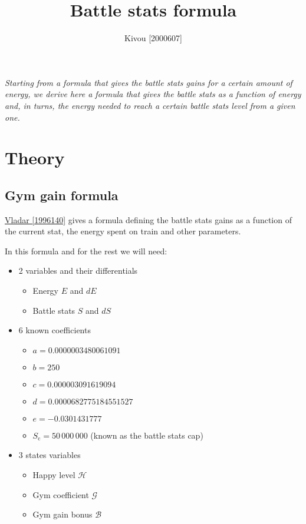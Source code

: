 \documentclass[12pt]{article}
\title{Battle stats formula}
\author{Kivou [2000607]}
\def\happy{\mathcal{H}}
\def\gym{\mathcal{G}}
\def\bonus{\mathcal{B}}
\def\Sc{S_\text{c}}
\begin{document}
\maketitle
\par {\it Starting from a formula that gives the battle stats gains for a certain amount of energy, we derive here  a formula that gives the battle stats as a function of energy and, in turns, the energy needed to reach a certain battle stats level from a given one.}

\section{Theory}
\subsection{Gym gain formula}
\href{https://www.torn.com/forums.php?p=threads&f=61&t=16003284&b=0&a=0&start=0&to=17684755}{Vladar [1996140]} gives a formula defining the battle stats gains as a function of the current stat, the energy spent on train and other parameters.

\par In this formula and for the rest we will need:
\begin{itemize}
    \item 2 variables and their differentials
    \begin{itemize}
        \item Energy $E$ and $dE$
        \item Battle stats $S$ and $dS$
    \end{itemize}
    \item 6 known coefficients
        \begin{itemize}
            \item $a = 0.0000003480061091$
            \item $b = 250$
            \item $c = 0.000003091619094$
            \item $d = 0.0000682775184551527$
            \item $e = -0.0301431777$
            \item $\Sc = 50\,000\,000$ (known as the battle stats cap)
        \end{itemize}
    \item 3 states variables
    \begin{itemize}
        \item Happy level $\happy$
        \item Gym coefficient $\gym$
        \item Gym gain bonus $\bonus$
    \end{itemize}
\end{itemize}
\end{document}
